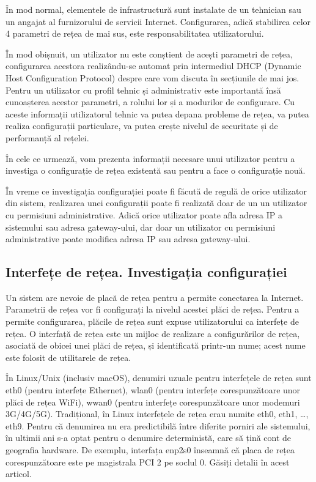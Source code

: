 În mod normal, elementele de infrastructură sunt instalate de un tehnician sau un angajat al furnizorului de servicii Internet. Configurarea, adică stabilirea celor 4 parametri de rețea de mai sus, este responsabilitatea utilizatorului.

În mod obișnuit, un utilizator nu este conștient de acești parametri de rețea, configurarea acestora realizându-se automat prin intermediul DHCP (Dynamic Host Configuration Protocol) despre care vom discuta în secțiunile de mai jos. Pentru un utilizator cu profil tehnic și administrativ este importantă însă cunoașterea acestor parametri, a rolului lor și a modurilor de configurare. Cu aceste informații utilizatorul tehnic va putea depana probleme de rețea, va putea realiza configurații particulare, va putea crește nivelul de securitate și de performanță al rețelei.

În cele ce urmează, vom prezenta informații necesare unui utilizator pentru a investiga o configurație de rețea existentă sau pentru a face o configurație nouă.

În vreme ce investigația configurației poate fi făcută de regulă de orice utilizator din sistem, realizarea unei configurații poate fi realizată doar de un un utilizator cu permisiuni administrative. Adică orice utilizator poate afla adresa IP a sistemului sau adresa gateway-ului, dar doar un utilizator cu permisiuni administrative poate modifica adresa IP sau adresa gateway-ului.

\subsection{Interfețe de rețea. Investigația configurației}
\label{sec:net:interface}

Un sistem are nevoie de placă de rețea pentru a permite conectarea la Internet. Parametrii de rețea vor fi configurați la nivelul acestei plăci de rețea. Pentru a permite configurarea, plăcile de rețea sunt expuse utilizatorului ca interfețe de rețea. O interfață de rețea este un mijloc de realizare a configurărilor de rețea, asociată de obicei unei plăci de rețea, și identificată printr-un nume; acest nume este folosit de utilitarele de rețea.

În Linux/Unix (inclusiv macOS), denumiri uzuale pentru interfețele de rețea sunt eth0 (pentru interfețe Ethernet), wlan0 (pentru interfețe corespunzătoare unor plăci de rețea WiFi), wwan0 (pentru interfețe corespunzătoare unor modemuri 3G/4G/5G). Tradițional, în Linux interfețele de rețea erau numite eth0, eth1, …, eth9. Pentru că denumirea nu era predictibilă între diferite porniri ale sistemului, în ultimii ani s-a optat pentru o denumire deterministă, care să țină cont de geografia hardware. De exemplu, interfața enp2s0 înseamnă că placa de rețea corespunzătoare este pe magistrala PCI 2 pe soclul 0. Găsiți detalii în acest articol.


